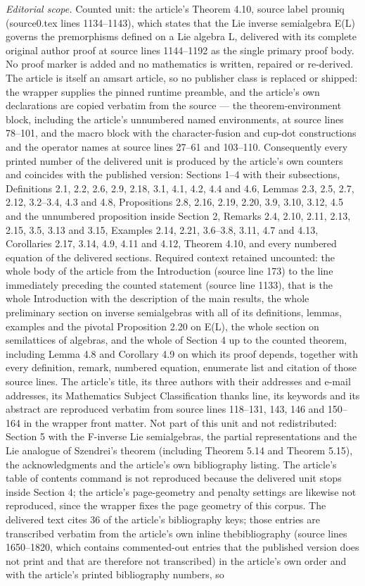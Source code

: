 \documentclass[10pt,a4paper]{amsart}
\theoremstyle{definition}
\theoremstyle{remark}
\numberwithin{equation}{section}
\newtheorem*{Theorem A}{\textbf{Theorem A}}
\newtheorem*{Corollary E}{\textbf{Corollary E}}
\newtheorem*{Corollary F}{\textbf{Corollary F}}
\newtheorem*{Theorem B}{\textbf{Theorem B}}
\newtheorem*{Theorem C}{\textbf{Theorem C}}
\newtheorem*{Theorem D}{\textbf{Theorem B}}
\newtheorem*{p a}{\textbf{Proof of  Theorem A}}
\newtheorem*{p b}{\textbf{Proof of Theorem B}}
\newtheorem*{p c}{\textbf{Proof of  Theorem C}}
\newtheorem*{p d}{\textbf{Proof of  Theorem D}}
\newcommand{\0}{{\vartheta}}
\begin{document}
\noindent\textit{Editorial scope.} Counted unit: the article's Theorem 4.10, source label prouniq (source0.tex lines 1134--1143), which states that the Lie inverse semialgebra E(L) governs the premorphisms defined on a Lie algebra L, delivered with its complete original author proof at source lines 1144--1192 as the single primary proof body. No proof marker is added and no mathematics is written, repaired or re-derived. The article is itself an amsart article, so no publisher class is replaced or shipped: the wrapper supplies the pinned runtime preamble, and the article's own declarations are copied verbatim from the source --- the theorem-environment block, including the article's unnumbered named environments, at source lines 78--101, and the macro block with the character-fusion and cup-dot constructions and the operator names at source lines 27--61 and 103--110. Consequently every printed number of the delivered unit is produced by the article's own counters and coincides with the published version: Sections 1--4 with their subsections, Definitions 2.1, 2.2, 2.6, 2.9, 2.18, 3.1, 4.1, 4.2, 4.4 and 4.6, Lemmas 2.3, 2.5, 2.7, 2.12, 3.2--3.4, 4.3 and 4.8, Propositions 2.8, 2.16, 2.19, 2.20, 3.9, 3.10, 3.12, 4.5 and the unnumbered proposition inside Section 2, Remarks 2.4, 2.10, 2.11, 2.13, 2.15, 3.5, 3.13 and 3.15, Examples 2.14, 2.21, 3.6--3.8, 3.11, 4.7 and 4.13, Corollaries 2.17, 3.14, 4.9, 4.11 and 4.12, Theorem 4.10, and every numbered equation of the delivered sections. Required context retained uncounted: the whole body of the article from the Introduction (source line 173) to the line immediately preceding the counted statement (source line 1133), that is the whole Introduction with the description of the main results, the whole preliminary section on inverse semialgebras with all of its definitions, lemmas, examples and the pivotal Proposition 2.20 on E(L), the whole section on semilattices of algebras, and the whole of Section 4 up to the counted theorem, including Lemma 4.8 and Corollary 4.9 on which its proof depends, together with every definition, remark, numbered equation, enumerate list and citation of those source lines. The article's title, its three authors with their addresses and e-mail addresses, its Mathematics Subject Classification thanks line, its keywords and its abstract are reproduced verbatim from source lines 118--131, 143, 146 and 150--164 in the wrapper front matter. Not part of this unit and not redistributed: Section 5 with the F-inverse Lie semialgebras, the partial representations and the Lie analogue of Szendrei's theorem (including Theorem 5.14 and Theorem 5.15), the acknowledgments and the article's own bibliography listing. The article's table of contents command is not reproduced because the delivered unit stops inside Section 4; the article's page-geometry and penalty settings are likewise not reproduced, since the wrapper fixes the page geometry of this corpus. The delivered text cites 36 of the article's bibliography keys; those entries are transcribed verbatim from the article's own inline thebibliography (source lines 1650--1820, which contains commented-out entries that the published version does not print and that are therefore not transcribed) in the article's own order and with the article's printed bibliography numbers, so 
\end{document}
